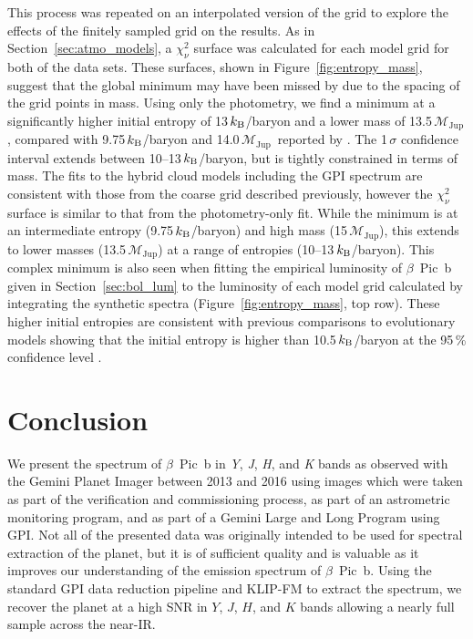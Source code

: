 \documentclass[twocolumn]{aastex6}
\newcommand{\mjup}{$\mathcal{M}_\mathrm{Jup}$}
\begin{document}
This process was repeated on an interpolated version of the grid to explore the effects of the finitely sampled grid on the results. As in Section~\ref{sec:atmo_models}, a $\chi^2_{\nu}$ surface was calculated for each model grid for both of the data sets. These surfaces, shown in Figure~\ref{fig:entropy_mass}, suggest that the global minimum may have been missed by \citet{Morzinski2015} due to the spacing of the grid points in mass. Using only the photometry, we find a minimum at a significantly higher initial entropy of 13\,$k_{\rm B}$/baryon and a lower mass of 13.5\,\mjup, compared with 9.75\,$k_{\rm B}$/baryon and 14.0\,\mjup\ reported by \citet{Morzinski2015}. The 1\,$\sigma$ confidence interval extends between 10--13\,$k_{\rm B}$/baryon, but is tightly constrained in terms of mass. The fits to the hybrid cloud models including the GPI spectrum are consistent with those from the coarse grid described previously, however the $\chi^2_{\nu}$ surface is similar to that from the photometry-only fit. While the minimum is at an intermediate entropy (9.75\,$k_{\rm B}$/baryon) and high mass (15\,\mjup), this extends to lower masses (13.5\,\mjup) at a range of entropies (10--13\,$k_{\rm B}$/baryon). This complex minimum is also seen when fitting the empirical luminosity of $\beta$~Pic~b given in Section~\ref{sec:bol_lum} to the luminosity of each model grid calculated by integrating the synthetic spectra (Figure~\ref{fig:entropy_mass}, top row). These higher initial entropies are consistent with previous comparisons to evolutionary models showing that the initial entropy is higher than 10.5\,$k_{\rm B}$/baryon at the 95\,\% confidence level \citep{Bonnefoy2014}. 

\section{Conclusion}\label{sec:Discussion}
We present the spectrum of $\beta$~Pic~b in {\it Y}, {\it J}, {\it H}, and {\it K} bands as observed with the Gemini Planet Imager between 2013 and 2016 using images which were taken as part of the verification and commissioning process, as part of an astrometric monitoring program, and as part of a Gemini Large and Long Program using GPI. Not all of the presented data was originally intended to be used for spectral extraction of the planet, but it is of sufficient quality and is valuable as it improves our understanding of the emission spectrum of $\beta$~Pic~b. Using the standard GPI data reduction pipeline and KLIP-FM to extract the spectrum, we recover the planet at a high SNR in $Y$, $J$, $H$, and $K$ bands allowing a nearly full sample across the near-IR.
\end{document}
